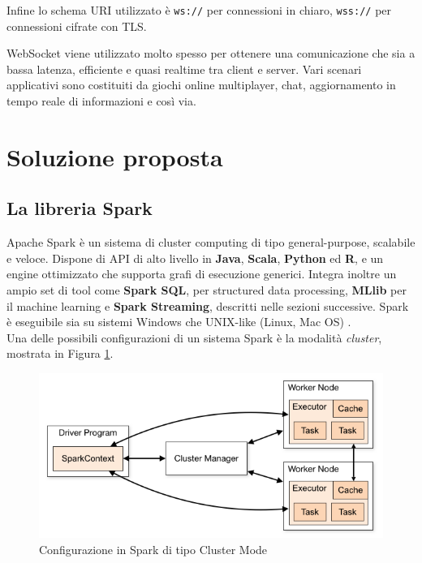 \documentclass[12pt]{article}
\begin{document}
Infine lo schema URI utilizzato è \texttt{ws://} per connessioni in chiaro, \texttt{wss://} per connessioni cifrate con TLS\cite{fette2011websocket}.

WebSocket viene utilizzato molto spesso per ottenere una comunicazione che sia a bassa latenza, efficiente e quasi realtime tra client e server. Vari scenari applicativi sono costituiti da giochi online multiplayer, chat, aggiornamento in tempo reale di informazioni e così via.

\section{Soluzione proposta}

\subsection{La libreria Spark}

Apache Spark è un sistema di cluster computing di tipo general-purpose, scalabile e veloce. Dispone di API di alto livello in \textbf{Java}, \textbf{Scala},\textbf{ Python} ed \textbf{R}, e un engine ottimizzato che supporta grafi di esecuzione generici. Integra inoltre un ampio set di tool come \textbf{Spark SQL}, per structured data processing, \textbf{MLlib} per il machine learning e \textbf{Spark Streaming}, descritti nelle sezioni successive. Spark è eseguibile sia su sistemi Windows che UNIX-like (Linux, Mac OS) \cite{spark}. \\

Una delle possibili configurazioni di un sistema Spark è la modalità \textit{cluster}, mostrata in Figura \ref{spark-cluster}. 

\begin{figure}[H]
	\centering
	\includegraphics[scale=0.50]{images/cluster-overview.png}
	\caption{Configurazione in Spark di tipo Cluster Mode \cite{spark}}
	\label{spark-cluster}
\end{figure}
\end{document}
